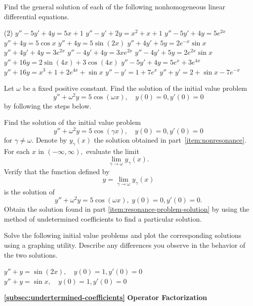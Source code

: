 \begin{Exercise}
\Question\label{3-3-8} Find the general solution of each of the following nonhomogeneous linear differential equations.
\begin{tasks}(2)
	\task \(y''-5y'+4y= 5x+1\)
	\task \(y''-y'+2y= x^2+x+1\)
	\task \(y''-5y'+4y= 5e^{2x}\)
	\task \(y''+4y= 5\cos x\)
	\task \(y''+4y= 5\sin(2x)\)
	\task \(y''+4y'+5y = 2e^{-x}\sin x\)
	\task \(y''+4y'+4y = 3e^{2x}\)
	\task \(y''-4y'+4y = 3xe^{2x}\)
	\task \(y''- 4y'+5y = 2e^{2x}\sin x\)
	\task \(y''+16y = 2\sin(4x)+3\cos(4x)\)
	\task \(y''-5y'+4y= 5e^x+3e^{4x}\)
	\task \(y''+16y = x^3+1+2e^{4x}+ \sin x\)
	\task \(y''-y'=1+7e^x\)
	\task \(y''+y' =2+\sin x -7e^{-x}\)
\end{tasks}
\Question\label{3-3-9} Let $\omega$ be a fixed positive constant. Find the  solution of the initial value problem
\[y''+\omega^2 y= 5\cos(\omega x),\quad  y(0)= 0, y'(0)=0\] by following the  steps below.
\begin{tasks}
	\task\label{item:nonresonance} Find the  solution of the initial value problem 
	\[y''+\omega^2 y= 5\cos(\gamma x),\quad  y(0)= 0, y'(0)=0\] for 
	\(\gamma\ne \omega.\)
	\task Denote by $y_\gamma(x)$  the  solution obtained in part~\ref{item:nonresonance}. For each $x$ in $(-\infty, \infty),$ evaluate the limit \[\lim\limits_{\gamma\to\omega}y_\gamma(x).\] 
	\task\label{item:resonance-problem-solution} Verify that the function defined by \[y = \lim\limits_{\gamma\to\omega}y_\gamma(x)\] is the  solution of \[y''+\omega^2 y= 5\cos(\omega x), \; y(0) =0, y'(0)=0.\] 
	\task Obtain the solution found in part \ref{item:resonance-problem-solution} by  using the method of undetermined coefficients to find a particular solution.
\end{tasks}

\Question\label{3-3-10} Solve the following initial value problems and plot the corresponding solutions  using a graphing utility. Describe any  differences you observe in the behavior of the two solutions.
\begin{tasks}
	\task \(y''+y=  \sin (2x), \quad y(0)=1, y'(0)=0\)
	\task \(y''+y=  \sin x, \quad y(0)=1, y'(0)=0\)\\
\end{tasks}


\hspace{-.75cm}\textbf{\ref{subsec:undertermined-coefficients}} \textbf{Operator Factorization}\\


\end{Exercise}
